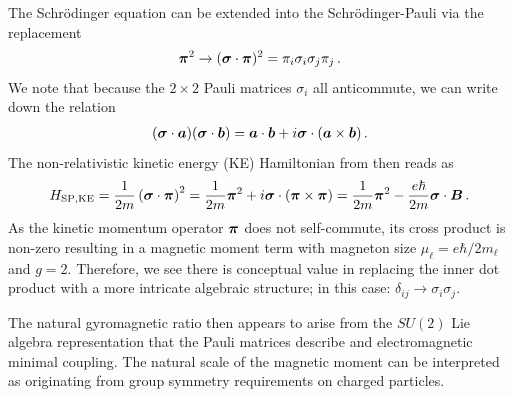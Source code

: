 The Schr{\"o}dinger equation can be extended into the Schr{\"o}dinger-Pauli  via the replacement
\begin{alignat}{1}
	\label{nat:0}
    \boldsymbol{\pi}^{2}\rightarrow(\boldsymbol{\sigma}\cdot\boldsymbol{\pi})^{2}=\pi_{i}\sigma_{i}\sigma_{j}\pi_{j}\,.
\end{alignat}
We note that because the $2\times2$ Pauli matrices $\sigma_{i}$ all anticommute, we can write down the relation
\begin{alignat}{1}
	\label{nat:1}
    (\boldsymbol{\sigma}\cdot\boldsymbol{a})(\boldsymbol{\sigma}\cdot\boldsymbol{b})=\boldsymbol{a}\cdot\boldsymbol{b}+i\boldsymbol{\sigma}\cdot(\boldsymbol{a}\times\boldsymbol{b})\,.
\end{alignat}
The non-relativistic kinetic energy (KE) Hamiltonian from  then reads as
\begin{align}
	\label{nat:2}
    {H}_{\mathrm{SP,KE}}=\frac{1}{2m}\left(\boldsymbol{\sigma}\cdot\boldsymbol{\pi}\right)^{2}=\frac{1}{2m}\boldsymbol{\pi}^{2}+i\boldsymbol{\sigma}\cdot(\boldsymbol{\pi}\times\boldsymbol{\pi})=\frac{1}{2m}\boldsymbol{\pi}^{2}-\frac{e\hbar}{2m}\boldsymbol{\sigma}\cdot\boldsymbol{B}\,.
\end{align}
As the kinetic momentum operator $\boldsymbol{\pi}$ does not self-commute, its cross product is non-zero resulting in a magnetic moment term with magneton size $\mu_{\ell}=e\hbar/2m_{\ell}$ and $g\!=\!2$. Therefore, we see there is conceptual value in replacing the inner dot product with a more intricate algebraic structure; in this case: $\delta_{ij}\rightarrow\sigma_{i}\sigma_{j}$.

The natural gyromagnetic ratio then appears to arise from the $SU(2)$ Lie algebra representation that the Pauli matrices describe and electromagnetic minimal coupling. The natural scale of the magnetic moment can be interpreted as originating from group symmetry requirements on charged particles.

